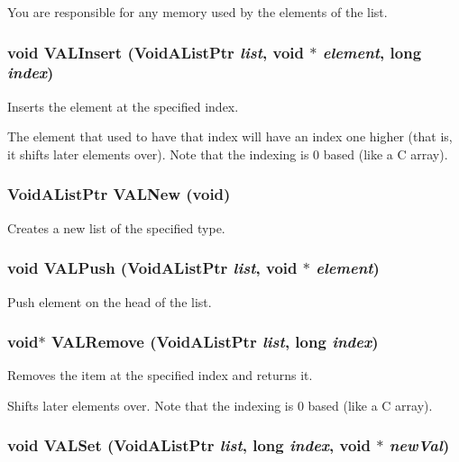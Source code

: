You are responsible for any memory used by the elements of the list. 
\subsubsection{\setlength{\rightskip}{0pt plus 5cm}void VALInsert (Void\-AList\-Ptr {\em list}, void $\ast$ {\em element}, long {\em index})}\label{lists_8h_a52}


Inserts the element at the specified index. 

The element that used to have that index will have an index one higher (that is, it shifts later elements over). Note that the indexing is 0 based (like a C array). 
\subsubsection{\setlength{\rightskip}{0pt plus 5cm}Void\-AList\-Ptr VALNew (void)}\label{lists_8h_a47}


Creates a new list of the specified type. 

\subsubsection{\setlength{\rightskip}{0pt plus 5cm}void VALPush (Void\-AList\-Ptr {\em list}, void $\ast$ {\em element})}\label{lists_8h_a49}


Push element on the head of the list. 

\subsubsection{\setlength{\rightskip}{0pt plus 5cm}void$\ast$ VALRemove (Void\-AList\-Ptr {\em list}, long {\em index})}\label{lists_8h_a51}


Removes the item at the specified index and returns it. 

Shifts later elements over. Note that the indexing is 0 based (like a C array). 
\subsubsection{\setlength{\rightskip}{0pt plus 5cm}void VALSet (Void\-AList\-Ptr {\em list}, long {\em index}, void $\ast$ {\em new\-Val})}\label{lists_8h_a53}


